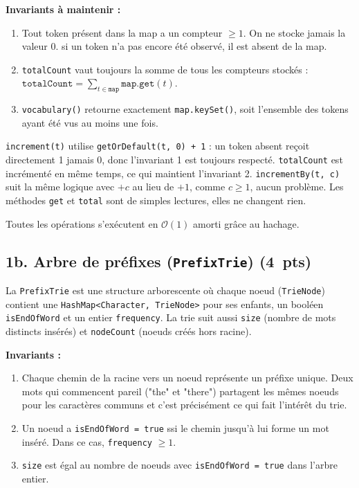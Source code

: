 \documentclass[12pt,a4paper]{article}
\newcommand{\jclass}[1]{\texttt{#1}}
\newcommand{\pts}[1]{\hfill\textbf{\small(#1~pts)}}
\newcommand{\bigo}[1]{$\mathcal{O}(#1)$}
\begin{document}
\textbf{Invariants à maintenir :}
\begin{enumerate}
  \item Tout token présent dans la map a un compteur $\geq 1$. On ne stocke jamais la valeur 0.
        si un token n'a pas encore été observé, il est absent de la map.
  \item \texttt{totalCount} vaut toujours la somme de tous les compteurs stockés :
        $\texttt{totalCount} = \sum_{t \in \texttt{map}} \texttt{map.get}(t)$.
  \item \texttt{vocabulary()} retourne exactement \texttt{map.keySet()}, soit
        l'ensemble des tokens ayant été vus au moins une fois.
\end{enumerate}

\texttt{increment(t)} utilise \texttt{getOrDefault(t, 0) + 1} : un token absent reçoit
directement 1 jamais 0, donc l'invariant 1 est toujours respecté. \texttt{totalCount}
est incrémenté en même temps, ce qui maintient l'invariant 2. \texttt{incrementBy(t, c)}
suit la même logique avec $+c$ au lieu de $+1$, comme $c \geq 1$, aucun problème.
Les méthodes \texttt{get} et \texttt{total} sont de simples lectures, elles ne changent rien.

Toutes les opérations s'exécutent en \bigo{1} amorti grâce au hachage.

\subsection*{1b. Arbre de préfixes (\jclass{PrefixTrie}) \pts{4}}

La \jclass{PrefixTrie} est une structure arborescente où chaque noeud (\jclass{TrieNode})
contient une \jclass{HashMap<Character, TrieNode>} pour ses enfants, un booléen
\texttt{isEndOfWord} et un entier \texttt{frequency}. La trie suit aussi \texttt{size}
(nombre de mots distincts insérés) et \texttt{nodeCount} (noeuds créés hors racine).

\textbf{Invariants :}
\begin{enumerate}
  \item Chaque chemin de la racine vers un noeud représente un préfixe unique. Deux mots
        qui commencent pareil ("the" et "there") partagent les mêmes noeuds pour
        les caractères communs et c'est précisément ce qui fait l'intérêt du trie.
  \item Un noeud a \texttt{isEndOfWord = true} ssi le chemin jusqu'à lui forme un mot
        inséré. Dans ce cas, \texttt{frequency} $\geq 1$.
  \item \texttt{size} est égal au nombre de noeuds avec \texttt{isEndOfWord = true}
        dans l'arbre entier.
\end{enumerate}
\end{document}
